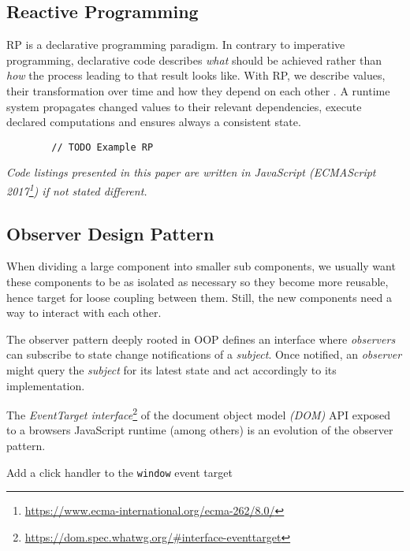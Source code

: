 \documentclass[12pt,a4paper]{article}
\begin{document}
\subsection{Reactive Programming}
RP is a declarative programming paradigm. In contrary to imperative programming, declarative code describes \emph{what} should be achieved rather than \emph{how} the process leading to that result looks like. With RP, we describe values, their transformation over time and how they depend on each other \cite{8354906}. A runtime system propagates changed values to their relevant dependencies, execute declared computations and ensures always a consistent state.

\begin{listing}[H]
	\begin{verbatim}
		// TODO Example RP
	\end{verbatim}
	\caption{}
	\label{lst:basic-rp-with-baconjs}
\end{listing}

\emph{Code listings presented in this paper are written in JavaScript (ECMAScript 2017\footnote{\url{https://www.ecma-international.org/ecma-262/8.0/}}) if not stated different.}

\subsection{Observer Design Pattern}
When dividing a large component into smaller sub components, we usually want these components to be as isolated as necessary so they become more reusable, hence target for loose coupling between them. Still, the new components need a way to interact with each other.

The observer pattern \cite{gamma1995design} deeply rooted in OOP defines an interface where \emph{observers} can subscribe to state change notifications of a \emph{subject}. Once notified, an \emph{observer} might query the \emph{subject} for its latest state and act accordingly to its implementation.

The \emph{EventTarget interface}\footnote{\url{https://dom.spec.whatwg.org/\#interface-eventtarget}} of the document object model \emph{(DOM)} API exposed to a browsers JavaScript runtime (among others) is an evolution of the observer pattern.

\begin{listing}[H]
	\caption{Add a click handler to the \texttt{window} event target}
	\label{lst:eventtarget}
\end{listing}
\end{document}
